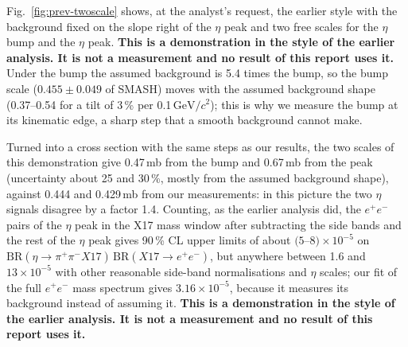 \documentclass[11pt,a4paper]{article}
\newcommand{\ee}{\ensuremath{e^{+}e^{-}}\xspace}
\newcommand{\pipi}{\ensuremath{\pi^{+}\pi^{-}}\xspace}
\newcommand{\GeVcc}{\ensuremath{\mathrm{GeV}/c^{2}}\xspace}
\newcommand{\BRX}{\ensuremath{\mathrm{BR}(\eta\to\pipi X17)\,\mathrm{BR}(X17\to\ee)}\xspace}
\begin{document}
Fig.~\ref{fig:prev-twoscale} shows, at the analyst's request, the earlier style with the background fixed on the slope right of the $\eta$
peak and two free scales for the $\eta$ bump and the $\eta$ peak. \textbf{This is a demonstration in the style of the earlier analysis. It is
not a measurement and no result of this report uses it.} Under the bump the assumed background is 5.4 times the bump, so the bump scale
($0.455\pm0.049$ of SMASH) moves with the assumed background shape (0.37--0.54 for a tilt of 3\,\% per 0.1\,\GeVcc); this is why we
measure the bump at its kinematic edge, a sharp step that a smooth background cannot make.

Turned into a cross section with the same steps as our results, the two scales of this demonstration give 0.47\,mb from the bump and
0.67\,mb from the peak (uncertainty about 25 and 30\,\%, mostly from the assumed background shape), against 0.444 and 0.429\,mb from our
measurements: in this picture the two $\eta$ signals disagree by a factor 1.4. Counting, as the earlier analysis did, the \ee pairs of the
$\eta$ peak in the X17 mass window after subtracting the side bands and the rest of the $\eta$ peak gives 90\,\% CL upper limits of about
$(5$--$8)\times10^{-5}$ on \BRX, but anywhere between 1.6 and $13\times10^{-5}$ with other reasonable side-band normalisations and $\eta$
scales; our fit of the full \ee mass spectrum gives $3.16\times10^{-5}$, because it measures its background instead of assuming it.
\textbf{This is a demonstration in the style of the earlier analysis. It is not a measurement and no result of this report uses it.}
\end{document}
